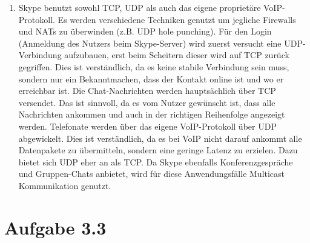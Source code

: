 \documentclass[german,12pt,a4paper]{article}
\begin{document}
\begin{enumerate}
	\item Skype benutzt sowohl TCP, UDP als auch das eigene proprietäre VoIP-Protokoll. Es werden
		verschiedene Techniken genutzt um jegliche Firewalls und NATs zu überwinden (z.B. UDP hole
		punching). Für den Login (Anmeldung des Nutzers beim Skype-Server) wird zuerst versucht eine UDP-Verbindung 
		aufzubauen, erst beim Scheitern dieser wird auf TCP zurück gegriffen. Dies ist
		verständlich, da es keine stabile Verbindung sein muss, sondern nur ein Bekanntmachen, dass der
		Kontakt online ist und wo er erreichbar ist. Die Chat-Nachrichten werden hauptsächlich über TCP
		versendet. Das ist sinnvoll, da es vom Nutzer gewünscht ist, dass alle Nachrichten ankommen und
		auch in der richtigen Reihenfolge angezeigt werden. Telefonate werden über das eigene VoIP-Protokoll 
		über UDP abgewickelt. Dies ist verständlich, da es bei VoIP nicht darauf ankommt alle
		Datenpakete zu übermitteln, sondern eine geringe Latenz zu erzielen. Dazu bietet sich UDP eher
		an als TCP. Da Skype ebenfalls Konferenzgespräche und Gruppen-Chats anbietet, wird für diese
		Anwendungsfälle Multicast Kommunikation genutzt.
	
\end{enumerate}

\section*{Aufgabe 3.3}
\end{document}
